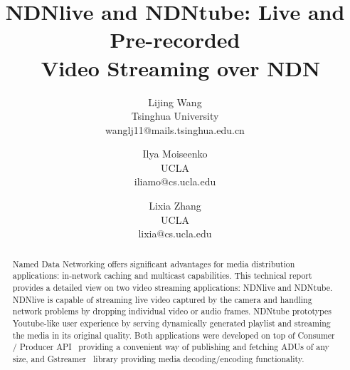 \documentclass{sig-alternate}
\title{NDNlive and NDNtube: Live and Pre-recorded \\\ Video Streaming over NDN}
\author{
Lijing Wang \\ {\normalsize Tsinghua University} \\ {\normalsize wanglj11@mails.tsinghua.edu.cn }
\and Ilya Moiseenko \\ {\normalsize UCLA} \\ {\normalsize iliamo@cs.ucla.edu }
\and Lixia Zhang \\ {\normalsize UCLA} \\ {\normalsize lixia@cs.ucla.edu }
}
\begin{document}
\maketitle

\begin{abstract}
Named Data Networking offers significant advantages for media distribution applications: in-network caching and multicast capabilities. This technical report provides a detailed view on two video streaming applications: NDNlive and NDNtube. 
NDNlive is capable of streaming live video captured by the camera and handling network problems by dropping individual video or audio frames. NDNtube prototypes Youtube-like user experience by serving dynamically generated playlist and streaming the media in its original quality. Both applications were developed on top of Consumer / Producer API~\cite{api-tr} providing a convenient way of publishing and fetching ADUs of any size, and Gstreamer~\cite{gstreamer} library providing media decoding/encoding functionality.
\end{abstract}








%


%



\end{document}
